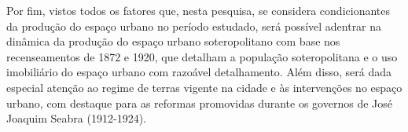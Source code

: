 Por fim, vistos todos os fatores que, nesta pesquisa, se considera condicionantes da produção do espaço urbano no período estudado, será possível adentrar na dinâmica da produção do espaço urbano soteropolitano com base nos recenseamentos de 1872 e 1920, que detalham a população soteropolitana e o uso imobiliário do espaço urbano com razoável detalhamento. Além disso, será dada especial atenção ao regime de terras vigente na cidade e às intervenções no espaço urbano, com destaque para as reformas promovidas durante os governos de José Joaquim Seabra (1912-1924).






